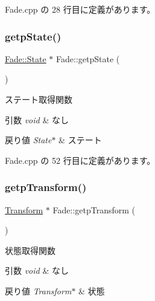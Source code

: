  Fade.\+cpp の 28 行目に定義があります。

\mbox{\label{class_fade_a5079a04d7f61eb68bf130ad418e0dbb8}} 
\subsubsection{\texorpdfstring{getp\+State()}{getpState()}}
{\footnotesize\ttfamily \mbox{\hyperlink{class_fade_ae77826bf3ff2ab95fb7b3b6f95cba80a}{Fade\+::\+State}} $\ast$ Fade\+::getp\+State (\begin{DoxyParamCaption}{ }\end{DoxyParamCaption})}



ステート取得関数 


\begin{DoxyParams}{引数}
{\em void} & なし \\
\hline
\end{DoxyParams}

\begin{DoxyRetVals}{戻り値}
{\em State$\ast$} & ステート \\
\hline
\end{DoxyRetVals}


 Fade.\+cpp の 52 行目に定義があります。

\mbox{\label{class_fade_ac703f40e9ed3f91c41525d884306a260}} 
\subsubsection{\texorpdfstring{getp\+Transform()}{getpTransform()}}
{\footnotesize\ttfamily \mbox{\hyperlink{class_transform}{Transform}} $\ast$ Fade\+::getp\+Transform (\begin{DoxyParamCaption}{ }\end{DoxyParamCaption})}



状態取得関数 


\begin{DoxyParams}{引数}
{\em void} & なし \\
\hline
\end{DoxyParams}

\begin{DoxyRetVals}{戻り値}
{\em Transform$\ast$} & 状態 \\
\hline
\end{DoxyRetVals}


